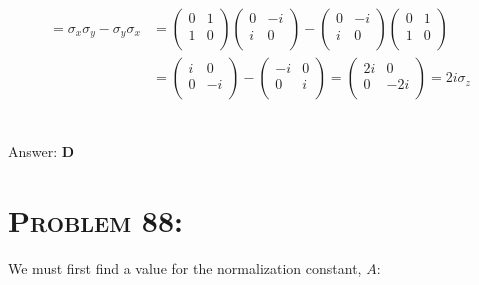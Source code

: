 \documentclass{article}
\begin{document}
\begin{align}
[\hspace{.02in} \sigma_{x}  \hspace{.02in} \text{,}  \hspace{.02in} \sigma_{y} \hspace{.02in}] = \sigma_{x}\sigma_{y} - \sigma_{y}\sigma_{x} &=
\left(
\begin{array}{cc}
0 & 1 \\
1 & 0 \\
\end{array} \right)
\left(
\begin{array}{cc}
0 & -i \\
i & 0 \\
\end{array} \right) -
\left(
\begin{array}{cc}
0 & -i \\
i & 0 \\
\end{array} \right)
\left(
\begin{array}{cc}
0 & 1 \\
1 & 0 \\
\end{array} \right) \nonumber\\
&=
\left(
\begin{array}{cc}
i & 0 \\
0 & -i \\
\end{array} \right) -
\left(
\begin{array}{cc}
-i & 0 \\
0 & i \\
\end{array} \right) =
\left(
\begin{array}{cc}
2i & 0 \\
0 & -2i \\
\end{array} \right) = \boxed{2 i \sigma_{z}} \nonumber
\end{align}
\\\\
Answer: \textbf{\textcolor{ProcessBlue}D}\\


\section{\textsc{Problem 88:}} We must first find a value for the normalization constant, $A$:
\end{document}

